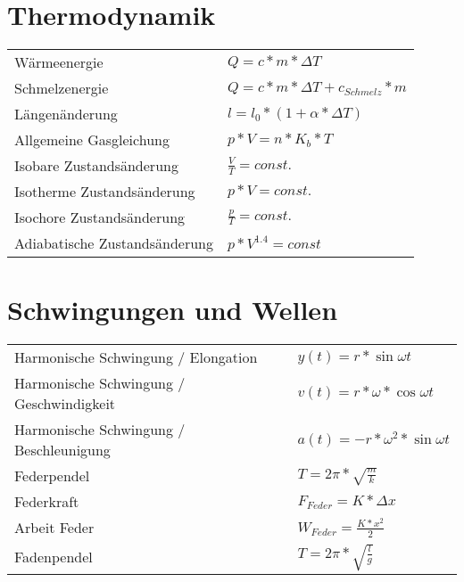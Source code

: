 \documentclass[12pt,a4paper]{paper}
\begin{document}
\section{Thermodynamik}
\begin{tabularx}{\textwidth}{X|X}
	Wärmeenergie & $Q=c*m*\Delta T$\\
	Schmelzenergie & $Q = c*m*\Delta T + c_{Schmelz} * m$\\
	Längenänderung & $l = l_0 * (1 + \alpha * \Delta T)$\\
	Allgemeine Gasgleichung & $p*V = n *K_b * T$\\
	Isobare Zustandsänderung & $\frac{V}{T} = const.$\\
	Isotherme Zustandsänderung & $p*V = const.$\\
	Isochore Zustandsänderung & $\frac{p}{T} = const.$\\
	Adiabatische Zustandsänderung & $p * V^{1.4} = const$
\end{tabularx}
\section{Schwingungen und Wellen}
\begin{tabularx}{\textwidth}{X|X}
Harmonische Schwingung / Elongation & $y(t) = r * \sin{\omega t}$\\
Harmonische Schwingung / Geschwindigkeit & $v(t) = r * \omega * \cos{\omega t}$\\
Harmonische Schwingung / Beschleunigung & $a(t) = -r * \omega^2 * \sin{\omega t}$\\
Federpendel & $T = 2\pi * \sqrt{\frac{m}{k}}$\\
Federkraft& $F_{Feder} = K * \Delta x$\\
Arbeit Feder & $W_{Feder} = \frac{K * x^2}{2}$\\
Fadenpendel & $T= 2\pi * \sqrt{\frac{l}{g}}$\\
\end{tabularx}
\end{document}
